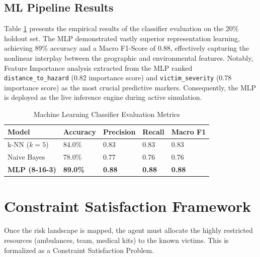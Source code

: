 \documentclass[conference]{IEEEtran}
\begin{document}
\subsection{ML Pipeline Results}
Table \ref{tab:ml_metrics} presents the empirical results of the classifier evaluation on the 20\% holdout set. The MLP demonstrated vastly superior representation learning, achieving 89\% accuracy and a Macro F1-Score of 0.88, effectively capturing the nonlinear interplay between the geographic and environmental features. Notably, Feature Importance analysis extracted from the MLP ranked \texttt{distance\_to\_hazard} (0.82 importance score) and \texttt{victim\_severity} (0.78 importance score) as the most crucial predictive markers. Consequently, the MLP is deployed as the live inference engine during active simulation.

\begin{table}[htbp]
\caption{Machine Learning Classifier Evaluation Metrics}
\label{tab:ml_metrics}
\centering
\renewcommand{\arraystretch}{1.2}
\begin{tabularx}{\columnwidth}{@{}lXXXX@{}}
\toprule
\textbf{Model} & \textbf{Accuracy} & \textbf{Precision} & \textbf{Recall} & \textbf{Macro F1} \\ \midrule
k-NN ($k=5$) & 84.0\% & 0.83 & 0.83 & 0.83 \\
Naive Bayes & 78.0\% & 0.77 & 0.76 & 0.76 \\
\textbf{MLP (8-16-3)} & \textbf{89.0\%} & \textbf{0.88} & \textbf{0.88} & \textbf{0.88} \\ \bottomrule
\end{tabularx}
\end{table}

\section{Constraint Satisfaction Framework}

Once the risk landscape is mapped, the agent must allocate the highly restricted resources (ambulances, team, medical kits) to the known victims. This is formalized as a Constraint Satisfaction Problem.
\end{document}
